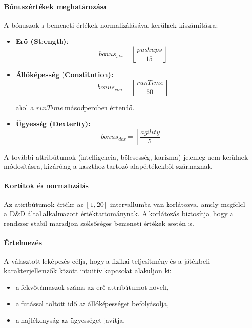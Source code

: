 \documentclass[
]{thesis-ekf}
\theoremstyle{definition}
\theoremstyle{remark}
\begin{document}
\paragraph{Bónuszértékek meghatározása}

A bónuszok a bemeneti értékek normalizálásával kerülnek kiszámításra:

\begin{itemize}
    \item \textbf{Erő (Strength):}
    \[
    bonus_{str} = \left\lfloor \frac{pushups}{15} \right\rfloor
    \]

    \item \textbf{Állóképesség (Constitution):}
    \[
    bonus_{con} = \left\lfloor \frac{runTime}{60} \right\rfloor
    \]

    ahol a $runTime$ másodpercben értendő.

    \item \textbf{Ügyesség (Dexterity):}
    \[
    bonus_{dex} = \left\lfloor \frac{agility}{5} \right\rfloor
    \]
\end{itemize}

A további attribútumok (intelligencia, bölcsesség, karizma) jelenleg nem kerülnek módosításra, kizárólag a kaszthoz tartozó alapértékekből származnak.

\paragraph{Korlátok és normalizálás}

Az attribútumok értéke az $[1, 20]$ intervallumba van korlátozva, amely megfelel a D\&D által alkalmazott értéktartománynak. A korlátozás biztosítja, hogy a rendszer stabil maradjon szélsőséges bemeneti értékek esetén is.

\paragraph{Értelmezés}

A választott leképezés célja, hogy a fizikai teljesítmény és a játékbeli karakterjellemzők között intuitív kapcsolat alakuljon ki:
\begin{itemize}
    \item a fekvőtámaszok száma az erő attribútumot növeli,
    \item a futással töltött idő az állóképességet befolyásolja,
    \item a hajlékonyság az ügyességet javítja.
\end{itemize}
\end{document}

